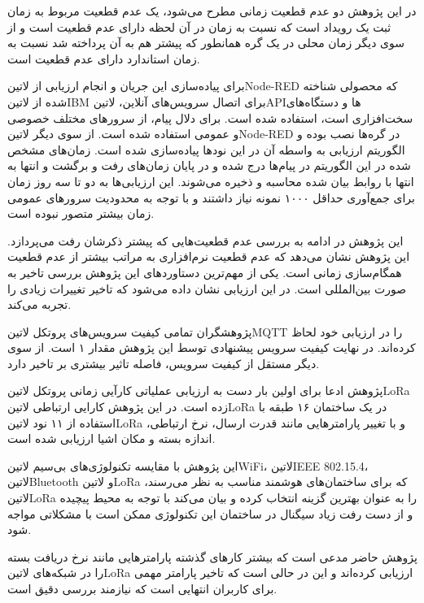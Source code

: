 در این پژوهش دو عدم قطعیت زمانی مطرح می‌شود، یک عدم قطعیت مربوط به زمان ثبت یک رویداد است که نسبت به زمان در آن لحظه دارای عدم قطعیت است و از سوی
دیگر زمان محلی در یک گره همانطور که پیشتر هم به آن پرداخته شد نسبت به زمان استاندارد دارای عدم قطعیت است.

برای پیاده‌سازی این جریان و انجام ارزیابی از ‌لاتین{Node-RED} که محصولی شناخته شده از ‌لاتین{IBM} برای اتصال سرویس‌های آنلاین، ‌لاتین{API}ها و
دستگاه‌های سخت‌افزاری است، استفاده شده است. برای دلال پیام، از سرور‌های مختلف خصوصی و عمومی استفاده شده است.
از سوی دیگر ‌لاتین{Node-RED} در گره‌ها نصب بوده و الگوریتم ارزیابی به واسطه آن در این نودها پیاده‌سازی شده است.
زمان‌های مشخص شده در این الگوریتم در پیام‌ها درج شده و در پایان زمان‌های رفت و برگشت و انتها به انتها با روابط بیان شده محاسبه و ذخیره می‌شوند.
این ارزیابی‌ها به دو تا سه روز زمان برای جمع‌آوری حداقل ۱۰۰۰ نمونه نیاز داشتند و با توجه به محدودیت سرورهای عمومی زمان بیشتر متصور نبوده است.

این پژوهش در ادامه به بررسی عدم قطعیت‌هایی که پیشتر ذکرشان رفت می‌پردازد. این پژوهش نشان می‌دهد که عدم قطعیت نرم‌افزاری به مراتب
بیشتر از عدم قطعیت همگام‌سازی زمانی است. یکی از مهم‌ترین دستاوردهای این پژوهش بررسی تاخیر به صورت بین‌المللی است. در این ارزیابی
نشان داده می‌شود که تاخیر تغییرات زیادی را تجربه می‌کند.

پژوهشگران تمامی کیفیت سرویس‌های پروتکل ‌لاتین{MQTT} را در ارزیابی خود لحاظ کرده‌اند. در نهایت کیفیت سرویس پیشنهادی توسط
این پژوهش مقدار ۱ است. از سوی دیگر مستقل از کیفیت سرویس، فاصله تاثیر بیشتری بر تاخیر دارد.


پژوهش  ادعا برای اولین بار دست به ارزیابی عملیاتی کارآیی زمانی پروتکل ‌لاتین{LoRa} زده است.
در این پژوهش کارایی ارتباطی ‌لاتین{LoRa} در یک ساختمان ۱۶ طبقه با استفاده از ۱۱ نود ‌لاتین{LoRa}
و با تغییر پارامترهایی مانند قدرت ارسال، نرخ ارتباطی، اندازه بسته و مکان اشیا ارزیابی شده است.

این پژوهش با مقایسه تکنولوژی‌های بی‌سیم ‌لاتین{WiFi}، ‌لاتین{IEEE 802.15.4}، ‌لاتین{Bluetooth}
و ‌لاتین{LoRa} که برای ساختمان‌های هوشمند مناسب به نظر می‌رسند، ‌لاتین{LoRa} را به عنوان بهترین گزینه انتخاب کرده
و بیان می‌کند با توجه به محیط پیچیده و از دست رفت زیاد سیگنال در ساختمان این تکنولوژی ممکن است با مشکلاتی مواجه شود.

پژوهش حاضر مدعی است که بیشتر کارهای گذشته پارامترهایی مانند نرخ دریافت بسته را در شبکه‌های ‌لاتین{LoRa} ارزیابی کرده‌اند و این در حالی است
که تاخیر پارامتر مهمی برای کاربران انتهایی است که نیازمند بررسی دقیق است.

